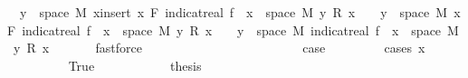 \begin{isabellebody}
\ {\isacharasterisk}{\kern0pt}{\isacharasterisk}{\kern0pt}{\isacharcolon}{\kern0pt}\ {\isachardoublequoteopen}{\isacharbraceleft}{\kern0pt}y\ {\isasymin}\ space\ M{\isachardot}{\kern0pt}\ {\isacharparenleft}{\kern0pt}{\isasymSum}x{\isasymin}insert\ x\ F{\isachardot}{\kern0pt}\ indicat{\isacharunderscore}{\kern0pt}real\ {\isacharparenleft}{\kern0pt}f\ {\isacharminus}{\kern0pt}{\isacharbackquote}{\kern0pt}\ {\isacharbraceleft}{\kern0pt}x{\isacharbraceright}{\kern0pt}\ {\isasyminter}\ space\ M{\isacharparenright}{\kern0pt}\ y\ {\isacharasterisk}{\kern0pt}\isactrlsub R\ x{\isacharparenright}{\kern0pt}\ {\isasymnoteq}\ {}{\isacharbraceright}{\kern0pt}\ {\isasymsubseteq}\ {\isacharbraceleft}{\kern0pt}y\ {\isasymin}\ space\ M{\isachardot}{\kern0pt}\ {\isacharparenleft}{\kern0pt}{\isasymSum}x{\isasymin}F{\isachardot}{\kern0pt}\ indicat{\isacharunderscore}{\kern0pt}real\ {\isacharparenleft}{\kern0pt}f\ {\isacharminus}{\kern0pt}{\isacharbackquote}{\kern0pt}\ {\isacharbraceleft}{\kern0pt}x{\isacharbraceright}{\kern0pt}\ {\isasyminter}\ space\ M{\isacharparenright}{\kern0pt}\ y\ {\isacharasterisk}{\kern0pt}\isactrlsub R\ x{\isacharparenright}{\kern0pt}\ {\isasymnoteq}\ {}{\isacharbraceright}{\kern0pt}\ {\isasymunion}\ {\isacharbraceleft}{\kern0pt}y\ {\isasymin}\ space\ M{\isachardot}{\kern0pt}\ indicat{\isacharunderscore}{\kern0pt}real\ {\isacharparenleft}{\kern0pt}f\ {\isacharminus}{\kern0pt}{\isacharbackquote}{\kern0pt}\ {\isacharbraceleft}{\kern0pt}x{\isacharbraceright}{\kern0pt}\ {\isasyminter}\ space\ M{\isacharparenright}{\kern0pt}\ y\ {\isacharasterisk}{\kern0pt}\isactrlsub R\ x\ {\isasymnoteq}\ {}{\isacharbraceright}{\kern0pt}{\isachardoublequoteclose}\ \isamarkupfalse%
\ {\isacharasterisk}{\kern0pt}\ \isamarkupfalse%
\ fastforce\ \ \ \ \isanewline
\ \ \ \ \isacommand{{\isacharbraceleft}{\kern0pt}}\isamarkupfalse%
\isanewline
\ \ \ \ \ \ \isamarkupfalse%
\ {}\isanewline
\ \ \ \ \ \ \isamarkupfalse%
\ {\isacharquery}{\kern0pt}case\ \isanewline
\ \ \ \ \ \ \isamarkupfalse%
\ {\isacharparenleft}{\kern0pt}cases\ {\isachardoublequoteopen}x\ {\isacharequal}{\kern0pt}\ {}{\isachardoublequoteclose}{\isacharparenright}{\kern0pt}\isanewline
\ \ \ \ \ \ \ \ \isamarkupfalse%
\ True\isanewline
\ \ \ \ \ \ \ \ \isamarkupfalse%
\ \isamarkupfalse%
\ {\isacharquery}{\kern0pt}thesis\ \isamarkupfalse%
\ {\isacharasterisk}{\kern0pt}\ \isamarkupfalse%

\end{isabellebody}
